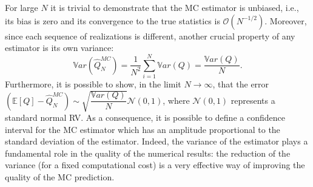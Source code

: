 For large $N$ it is trivial to demonstrate that the MC estimator is unbiased, i.e., its bias is zero and its convergence
to the true statistics is $\mathcal{O}(N^{-1/2})$. Moreover, since each sequence of realizations is different, another crucial property 
of any estimator is its own variance:
\begin{equation}\label{EQ: variance MC}
 \mathbb{V}ar\left( \hat{Q}_N^{MC} \right)  = \dfrac{1}{N^2} \sum_{i=1}^{N} \mathbb{V}ar\left( Q \right) 
            = \dfrac{\mathbb{V}ar\left(Q\right) }{N}.
\end{equation}
Furthermore, it is possible to show, in the limit $N \rightarrow \infty$, that the error $\left( \mathbb{E}\left[Q\right] - \hat{Q}_N^{MC} \right) \sim 
\sqrt{\dfrac{\mathbb{V}ar\left(Q\right) }{N}} \mathcal{N}(0,1)$, where $\mathcal{N}(0,1)$ represents a standard normal RV. As a consequence, it is possible to define a confidence
interval for the MC estimator which has an amplitude proportional to the standard deviation of the estimator.
Indeed, the variance of the estimator plays a fundamental role in the quality of the
numerical results: the reduction of the variance (for a fixed computational cost) 
is a very effective way of improving the quality of the MC prediction. 

